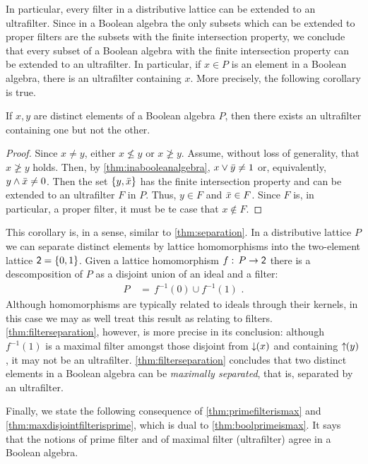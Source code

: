 In particular, every filter in a distributive lattice can be extended to an
ultrafilter. Since in a Boolean algebra the only subsets which can be
extended to proper filters are the subsets with the finite intersection
property, we conclude that every subset of a Boolean algebra with the
finite intersection property can be extended to an ultrafilter. In particular,
if $x\in P$ is an element in a Boolean algebra, there is an ultrafilter
containing $x$. More precisely, the following corollary is true.

\begin{thmFilterSeparation}\label{thm:filterseparation}
	If $x,y$ are distinct elements of a Boolean algebra $P$, then
	there exists an ultrafilter containing one but not the other.
\end{thmFilterSeparation}

\begin{proof}
	Since $x\not = y$, either $x\not\leq y$ or $x\not\geq y$.
	Assume, without loss of generality, that $x\not\geq y$ holds.
	Then, by \ref{thm:inabooleanalgebra}, $x\vee\bar{y}\not =1$
	or, equivalently, $y\wedge\bar{x}\not =0$. Then the set
	$\{y,\bar{x}\}$ has the finite intersection property and can
	be extended to an ultrafilter $F$ in $P$. Thus, $y\in F$ and
	$\bar{x}\in F$. Since $F$ is, in particular, a proper filter,
	it must be te case that $x\not\in F$.
\end{proof}

This corollary is, in a sense, similar to \ref{thm:separation}.
In a distributive lattice $P$ we can separate distinct elements by lattice
homomorphisms into the two-element lattice $\mathsf{2}=\{0,1\}$. Given a lattice
homomorphism $f:\,P\rightarrow\mathsf{2}$ there is a descomposition of $P$
as a disjoint union of an ideal and a filter:
\begin{align*}
	P & \,=\,f^{-1}(0)\cup f^{-1}(1)
	\text{ .}
\end{align*}
%
Although homomorphisms are typically related to ideals through their kernels,
in this case we may as well treat this result as relating to filters.
\ref{thm:filterseparation}, however, is more precise in its conclusion:
although $f^{-1}(1)$ is a maximal filter amongst those disjoint from
$\downarrow\!\!(x)$ and containing $\uparrow\!\!(y)$, it may not be an ultrafilter.
\ref{thm:filterseparation} concludes that two distinct elements in a Boolean
algebra can be \emph{maximally separated}, that is, separated by an
ultrafilter.

Finally, we state the following consequence of \ref{thm:primefilterismax}
and \ref{thm:maxdisjointfilterisprime}, which is dual to
\ref{thm:boolprimeismax}. It says that the notions of prime filter and of
maximal filter (ultrafilter) agree in a Boolean algebra.

